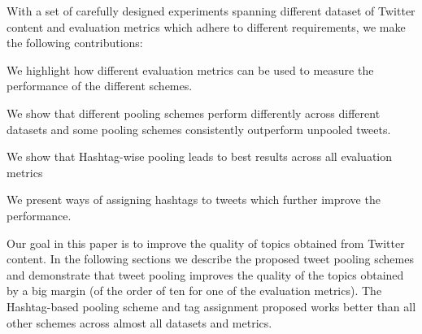 \documentclass[10pt,a5paper,twoside]{article}
\begin{document}
With a set of carefully designed experiments spanning different dataset of Twitter content and evaluation metrics which adhere to different requirements, we make the following contributions:
\begin{compactitem}
\item We highlight how different evaluation metrics can be used to measure the performance of the different schemes.
\item We show that different pooling schemes perform differently across different datasets and some pooling schemes consistently outperform unpooled tweets.
\item We show that Hashtag-wise pooling leads to best results across all evaluation metrics
\item We present ways of assigning hashtags to tweets which further improve the performance.
\end{compactitem}

Our goal in this paper is to improve the quality of topics obtained from Twitter content. In the following sections we describe the proposed tweet pooling schemes  and demonstrate that tweet pooling improves the quality of the topics obtained by a big margin (of the order of ten for one of the evaluation metrics). The Hashtag-based pooling scheme and tag assignment proposed works better than all other schemes across almost all datasets and metrics. 


\end{document}
